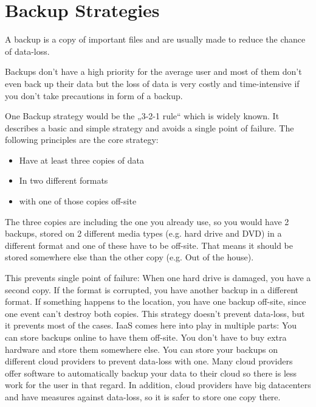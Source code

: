\section{Backup Strategies}
A backup is a copy of important files and are usually made to reduce the chance of data-loss.

Backups don't have a high priority for the average user and most of them don't even back up their data 
\cite{stat_backup} but the loss of data is very costly and time-intensive if you don't take precautions in form of a backup.

One Backup strategy would be the „3-2-1 rule“ which is widely known. It describes a basic and simple strategy and avoids a single point of failure.
The following principles are the core strategy:
\begin{itemize}
	\itemsep0em 
	\item Have at least three copies of data
	\item In two different formats
	\item with one of those copies off-site
\end{itemize}
The three copies are including the one you already use, so you would have 2 backups, stored on 2 different media types (e.g. hard drive and DVD) in a different format and one of these have to be off-site. That means it should be stored somewhere else than the other copy (e.g. Out of the house).

This prevents single point of failure: When one hard drive is damaged, you have a second copy. If the format is corrupted, you have another backup in a different format. If something happens to the location, you have one backup off-site, since one event can't destroy both copies.
This strategy doesn't prevent data-loss, but it prevents most of the cases.
\cite{micro_2013}
IaaS comes here into play in multiple parts: You can store backups online to have them off-site. You don't have to buy extra hardware and store them somewhere else. You can store your backups on different cloud providers to prevent data-loss with one. Many cloud providers offer software to automatically backup your data to their cloud so there is less work for the user in that regard. In addition, cloud providers have big datacenters and have measures against data-loss, so it is safer to store one copy there.
\cite{google_centers}

